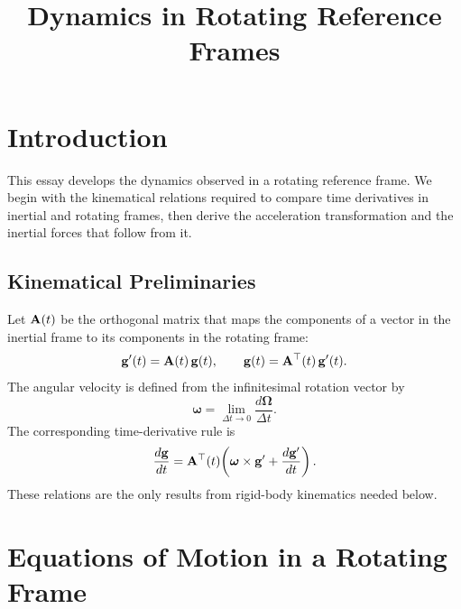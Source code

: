 \documentclass[12pt]{article}
\title{Dynamics in Rotating Reference Frames}
\author{}
\date{}
\begin{document}
\maketitle

\section{Introduction}

This essay develops the dynamics observed in a rotating reference frame. We begin with the
kinematical relations required to compare time derivatives in inertial and rotating frames,
then derive the acceleration transformation and the inertial forces that follow from it.

\subsection{Kinematical Preliminaries}

Let $\vb{A}(t)$ be the orthogonal matrix that maps the components of a vector in the inertial
frame to its components in the rotating frame:
\begin{equation}
  \vb{g}'(t) = \vb{A}(t)\,\vb{g}(t),
  \qquad
  \vb{g}(t) = \vb{A}^{\top}(t)\,\vb{g}'(t).
  \label{rotating-frames:frame-transformation}
\end{equation}
The angular velocity is defined from the infinitesimal rotation vector by
\begin{equation}
  \boldsymbol{\omega} = \lim_{\Delta t\to0}\frac{d\boldsymbol{\Omega}}{\Delta t}.
  \label{rotating-frames:angular-velocity-definition}
\end{equation}
The corresponding time-derivative rule is
\begin{equation}
  \frac{d\vb{g}}{dt}
  = \vb{A}^{\top}(t)\!\left(
      \boldsymbol{\omega}\times\vb{g}' + \frac{d\vb{g}'}{dt}
    \right).
  \label{rotating-frames:time-derivative-rule}
\end{equation}
These relations are the only results from rigid-body kinematics needed below.

\section{Equations of Motion in a Rotating Frame}
\end{document}
